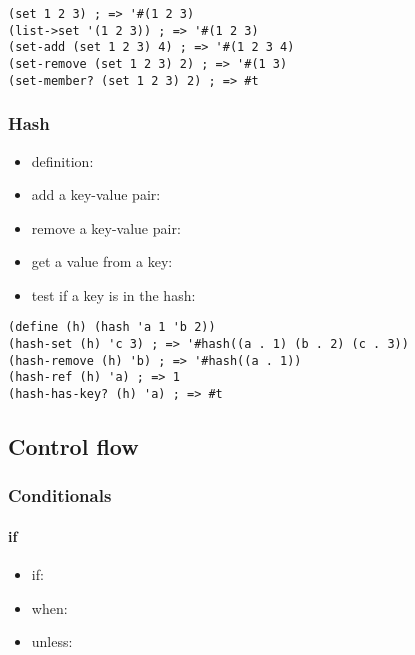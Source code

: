 \documentclass[a4paper,landscape,10pt]{article}
\begin{document}
\begin{multicols*}{2}
  \begin{lstlisting}[language=Racket]
(set 1 2 3) ; => '#(1 2 3)
(list->set '(1 2 3)) ; => '#(1 2 3)
(set-add (set 1 2 3) 4) ; => '#(1 2 3 4)
(set-remove (set 1 2 3) 2) ; => '#(1 3)
(set-member? (set 1 2 3) 2) ; => #t
  \end{lstlisting}

  \subsubsection{Hash}

  \begin{itemize}
    \item definition: 
    \item add a key-value pair: 
    \item remove a key-value pair: 
    \item get a value from a key: 
    \item test if a key is in the hash: 
  \end{itemize}

  \begin{lstlisting}[language=Racket]
(define (h) (hash 'a 1 'b 2))
(hash-set (h) 'c 3) ; => '#hash((a . 1) (b . 2) (c . 3))
(hash-remove (h) 'b) ; => '#hash((a . 1))
(hash-ref (h) 'a) ; => 1
(hash-has-key? (h) 'a) ; => #t
  \end{lstlisting}

  \breakcolumn

  \subsection{Control flow}

  \subsubsection{Conditionals}

  \paragraph{if}

  \begin{itemize}
    \item if: 
    \item when: 
    \item unless: 
  \end{itemize}


\end{multicols*}
\end{document}
